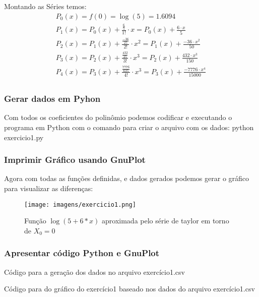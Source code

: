 Montando as Séries temos:
    \begin{gather*}
        P_0 (x) = f(0) = \log(5) = 1.6094\\
        P_1 (x) = P_0(x) + \frac{\frac{6}{5}}{1!} \cdot x = P_0(x) + \frac{6 \cdot x}{5} \\
        P_2 (x) = P_1(x) + \frac{\frac{-36}{25}}{2!} \cdot x^2 = P_1(x) + \frac{-36 \cdot x^2}{50} \\
        P_3 (x) = P_2(x) + \frac{\frac{432}{25}}{3!} \cdot x^3 = P_2(x) + \frac{432 \cdot x^3}{150} \\
        P_4 (x) = P_3(x) + \frac{\frac{7776}{625}}{4!} \cdot x^3 = P_3(x) + \frac{-7776 \cdot x^4}{15000} \\
    \end{gather*}

\subsubsection{Gerar dados em Pyhon}

Com todos os coeficientes do polinômio podemos codificar e executando o programa em Python com o comando para criar o arquivo com os dados: python exercicio1.py


\subsubsection{Imprimir Gráfico usando GnuPlot}

Agora com todas as funções definidas, e dados gerados podemos gerar o gráfico para visualizar as diferenças:

\begin{figure}[htbp]
    \centering
    \texttt{[image: imagens/exercicio1.png]}
    \caption{Função $\log(5+6*x)$ aproximada pelo série de taylor em torno de $X_0=0$}
    \label{fig:grafico}
\end{figure}

\newpage

\subsubsection{Apresentar código Python e GnuPlot}


Código para a geração dos dados no arquivo exercício1.csv
\newpage


Código para do gráfico do exercício1 baseado nos dados do arquivo exercício1.csv






